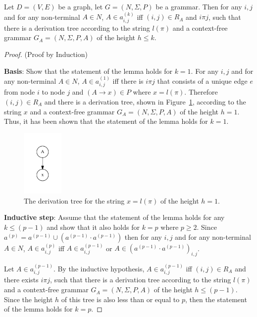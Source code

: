 \begin{lemma}\label{lemma:cf}
Let $D = (V,E)$ be a graph, let $G =(N,\Sigma,P)$ be a grammar. Then for any $i, j$ and for any non-terminal $A \in N$, $A \in a^{(k)}_{i,j}$ iff $(i,j) \in R_A$ and $i \pi j$, such that there is a derivation tree according to the string $l(\pi)$ and a context-free grammar $G_A = (N,\Sigma,P,A)$ of the height $h \leq k$.
\end{lemma}
\begin{proof}(Proof by Induction)

\textbf{Basis}: Show that the statement of the lemma holds for $k = 1$. For any $i, j$ and for any non-terminal $A \in N$, $A \in a^{(1)}_{i,j}$ iff there is $i \pi j$ that consists of a unique edge $e$ from node $i$ to node $j$ and $(A \rightarrow x) \in P$ where $x = l(\pi)$. Therefore $(i,j) \in R_A$ and there is a derivation tree, shown in Figure~\ref{tree1}, according to the string $x$ and a context-free grammar $G_A = (N,\Sigma,P,A)$ of the height $h = 1$. Thus, it has been shown that the statement of the lemma holds for $k = 1$.

\begin{figure}[h!]
 \centering
 \includegraphics[width=2cm]{pictures/tree1.pdf}
 \caption{The derivation tree for the string $x = l(\pi)$ of the height $h = 1$.}
 \label{tree1}
\end{figure}

\textbf{Inductive step}: Assume that the statement of the lemma holds for any $k \leq (p - 1)$ and show that it also holds for $k = p$ where $p \geq 2$. Since $a^{(p)} = a^{(p-1)} \cup (a^{(p-1)} \cdot a^{(p-1)})$ then for any $i, j$ and for any non-terminal $A \in N$, $A \in a^{(p)}_{i,j}$ iff $A \in a^{(p-1)}_{i,j}$ or $A \in (a^{(p-1)} \cdot a^{(p-1)})_{i,j}$.

Let $A \in a^{(p-1)}_{i,j}$. By the inductive hypothesis, $A \in a^{(p-1)}_{i,j}$ iff $(i,j) \in R_A$ and there exists $i \pi j$, such that there is a derivation tree according to the string $l(\pi)$ and a context-free grammar $G_A = (N,\Sigma,P,A)$ of the height $h \leq (p-1)$. Since the height $h$ of this tree is also less than or equal to $p$, then the statement of the lemma holds for $k = p$.


\end{proof}
